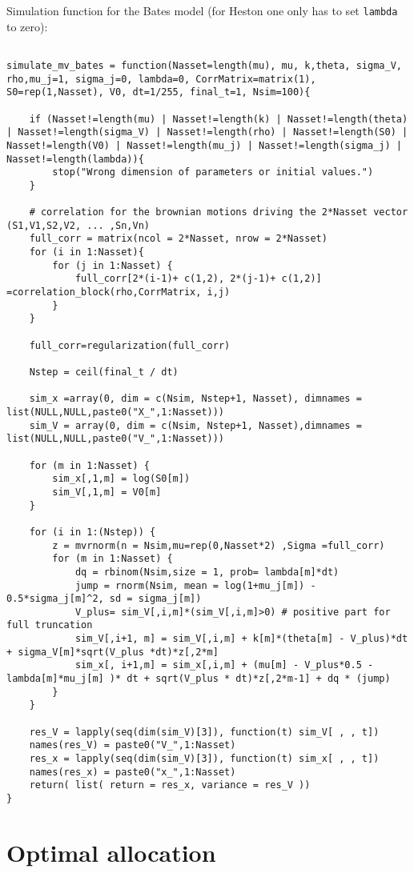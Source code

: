 \bigskip
\noindent
Simulation function for the Bates model (for Heston one only has to set \texttt{lambda} to zero):
\begin{lstlisting}

simulate_mv_bates = function(Nasset=length(mu), mu, k,theta, sigma_V, rho,mu_j=1, sigma_j=0, lambda=0, CorrMatrix=matrix(1), S0=rep(1,Nasset), V0, dt=1/255, final_t=1, Nsim=100){
	
	if (Nasset!=length(mu) | Nasset!=length(k) | Nasset!=length(theta) | Nasset!=length(sigma_V) | Nasset!=length(rho) | Nasset!=length(S0) | Nasset!=length(V0) | Nasset!=length(mu_j) | Nasset!=length(sigma_j) | Nasset!=length(lambda)){
		stop("Wrong dimension of parameters or initial values.")
	}
	
	# correlation for the brownian motions driving the 2*Nasset vector (S1,V1,S2,V2, ... ,Sn,Vn)
	full_corr = matrix(ncol = 2*Nasset, nrow = 2*Nasset) 
	for (i in 1:Nasset){
		for (j in 1:Nasset) {
			full_corr[2*(i-1)+ c(1,2), 2*(j-1)+ c(1,2)] =correlation_block(rho,CorrMatrix, i,j)
		}
	}
	
	full_corr=regularization(full_corr)
	
	Nstep = ceil(final_t / dt)
	
	sim_x =array(0, dim = c(Nsim, Nstep+1, Nasset), dimnames = list(NULL,NULL,paste0("X_",1:Nasset)))
	sim_V = array(0, dim = c(Nsim, Nstep+1, Nasset),dimnames = list(NULL,NULL,paste0("V_",1:Nasset)))
	
	for (m in 1:Nasset) {
		sim_x[,1,m] = log(S0[m])
		sim_V[,1,m] = V0[m]
	}
	
	for (i in 1:(Nstep)) {
		z = mvrnorm(n = Nsim,mu=rep(0,Nasset*2) ,Sigma =full_corr)
		for (m in 1:Nasset) {
			dq = rbinom(Nsim,size = 1, prob= lambda[m]*dt)
			jump = rnorm(Nsim, mean = log(1+mu_j[m]) - 0.5*sigma_j[m]^2, sd = sigma_j[m])
			V_plus= sim_V[,i,m]*(sim_V[,i,m]>0) # positive part for full truncation
			sim_V[,i+1, m] = sim_V[,i,m] + k[m]*(theta[m] - V_plus)*dt + sigma_V[m]*sqrt(V_plus *dt)*z[,2*m]
			sim_x[, i+1,m] = sim_x[,i,m] + (mu[m] - V_plus*0.5 -lambda[m]*mu_j[m] )* dt + sqrt(V_plus * dt)*z[,2*m-1] + dq * (jump)
		}
	}
	
	res_V = lapply(seq(dim(sim_V)[3]), function(t) sim_V[ , , t])
	names(res_V) = paste0("V_",1:Nasset)
	res_x = lapply(seq(dim(sim_V)[3]), function(t) sim_x[ , , t])
	names(res_x) = paste0("x_",1:Nasset)
	return( list( return = res_x, variance = res_V ))
}
\end{lstlisting}


\section{Optimal allocation}

